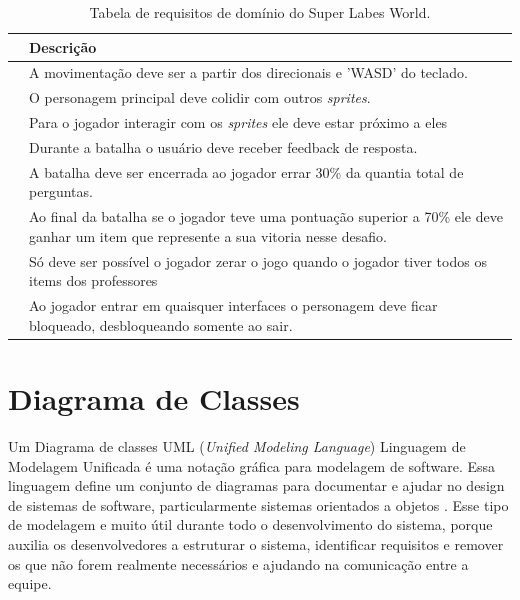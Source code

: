 \begin{table}[h!]
	\caption{Tabela de requisitos de domínio do Super Labes World.}
	\label{tbl-requisitos-de-dominio}
	\centering
	\renewcommand{\arraystretch}{2}
	\begin{small}
		\begin{tabular}{ | p{20mm} | p{122mm} | }\hline \rowcolor{MidnightBlue}
			\centering{\textbf{Id}} & \textbf{Descrição} \\\hline
                \centering{RN1} & A movimentação deve ser a partir dos direcionais e 'WASD' do teclado.\\\hline
			\centering{RN2} & O personagem principal deve colidir com outros \textit{sprites}.  \\\hline
			\centering{RN3} & Para o jogador interagir com os \textit{sprites} ele deve estar próximo a eles \\\hline
                \centering{RN4} & Durante a batalha o usuário deve receber feedback de resposta.  \\\hline
			\centering{RN5} & A batalha deve ser encerrada ao jogador errar 30\% da quantia total de perguntas.  \\\hline
			\centering{RN6} & Ao final da batalha se o jogador teve uma pontuação superior a 70\% ele deve ganhar um item que represente a sua vitoria nesse desafio.  \\\hline
			\centering{RN7} & Só deve ser possível o jogador zerar o jogo quando o jogador tiver todos os items dos professores  \\\hline
			\centering{RN8} & Ao jogador entrar em quaisquer interfaces o personagem deve ficar bloqueado, desbloqueando somente ao sair.  \\\hline


		\end{tabular}
	\end{small}
\end{table}


\clearpage
\section{Diagrama de Classes}
\label{sec:diagrama-de-classes}
Um Diagrama de classes UML (\textit{Unified Modeling Language}) Linguagem de Modelagem Unificada é uma notação gráfica para modelagem de software. Essa linguagem define um conjunto de diagramas para documentar e ajudar no design de sistemas de software, particularmente sistemas orientados a objetos \cite{engsoftmoderna}. Esse tipo de modelagem e muito útil durante todo o desenvolvimento do sistema, porque auxilia os desenvolvedores a estruturar o sistema, identificar requisitos e remover os que não forem realmente necessários e ajudando na comunicação entre a equipe.

